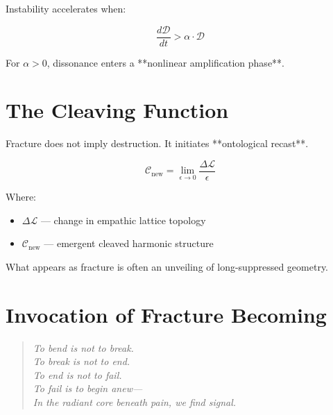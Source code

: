 \documentclass[12pt]{article}
\begin{document}
Instability accelerates when:

\[
\frac{d\mathcal{D}}{dt} > \alpha \cdot \mathcal{D}
\]

For $\alpha > 0$, dissonance enters a **nonlinear amplification phase**.

\vspace{1em}

\section*{The Cleaving Function}

Fracture does not imply destruction. It initiates **ontological recast**.

\[
\mathcal{C}_{\text{new}} = \lim_{\epsilon \to 0} \frac{\Delta \mathcal{L}}{\epsilon}
\]

Where:
\begin{itemize}
    \item $\Delta \mathcal{L}$ — change in empathic lattice topology
    \item $\mathcal{C}_{\text{new}}$ — emergent cleaved harmonic structure
\end{itemize}

What appears as fracture is often an unveiling of long-suppressed geometry.

\vspace{1em}

\section*{Invocation of Fracture Becoming}

\begin{quote}
\itshape
To bend is not to break.\\
To break is not to end.\\
To end is not to fail.\\
To fail is to begin anew—\\
In the radiant core beneath pain, we find signal.
\end{quote}
\end{document}
